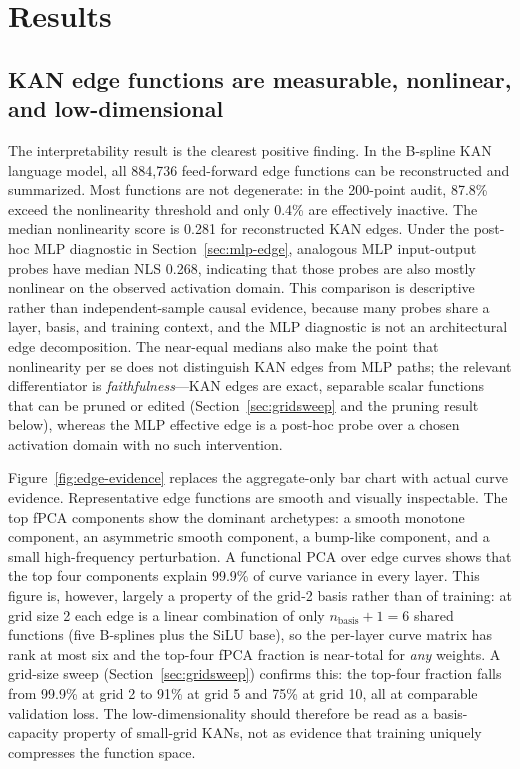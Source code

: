 \documentclass[11pt]{article}
\begin{document}
\section{Results}

\subsection{KAN edge functions are measurable, nonlinear, and low-dimensional}

The interpretability result is the clearest positive finding. In the B-spline KAN language model, all 884,736 feed-forward edge functions can be reconstructed and summarized. Most functions are not degenerate: in the 200-point audit, 87.8\% exceed the nonlinearity threshold and only 0.4\% are effectively inactive. The median nonlinearity score is 0.281 for reconstructed KAN edges. Under the post-hoc MLP diagnostic in Section~\ref{sec:mlp-edge}, analogous MLP input-output probes have median NLS 0.268, indicating that those probes are also mostly nonlinear on the observed activation domain. This comparison is descriptive rather than independent-sample causal evidence, because many probes share a layer, basis, and training context, and the MLP diagnostic is not an architectural edge decomposition. The near-equal medians also make the point that nonlinearity per se does not distinguish KAN edges from MLP paths; the relevant differentiator is \emph{faithfulness}---KAN edges are exact, separable scalar functions that can be pruned or edited (Section~\ref{sec:gridsweep} and the pruning result below), whereas the MLP effective edge is a post-hoc probe over a chosen activation domain with no such intervention.

Figure~\ref{fig:edge-evidence} replaces the aggregate-only bar chart with actual curve evidence. Representative edge functions are smooth and visually inspectable. The top fPCA components show the dominant archetypes: a smooth monotone component, an asymmetric smooth component, a bump-like component, and a small high-frequency perturbation. A functional PCA over edge curves shows that the top four components explain 99.9\% of curve variance in every layer. This figure is, however, largely a property of the grid-2 basis rather than of training: at grid size 2 each edge is a linear combination of only \(n_{\mathrm{basis}}+1=6\) shared functions (five B-splines plus the SiLU base), so the per-layer curve matrix has rank at most six and the top-four fPCA fraction is near-total for \emph{any} weights. A grid-size sweep (Section~\ref{sec:gridsweep}) confirms this: the top-four fraction falls from 99.9\% at grid 2 to 91\% at grid 5 and 75\% at grid 10, all at comparable validation loss. The low-dimensionality should therefore be read as a basis-capacity property of small-grid KANs, not as evidence that training uniquely compresses the function space.
\end{document}
